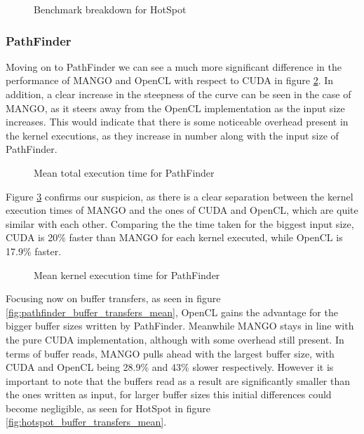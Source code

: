 \begin{figure}
    \centering
    \resizebox{!}{160pt}{
        
    }
    \captionsetup{justification=centering}
    \caption{Benchmark breakdown for HotSpot}
    \label{fig:hotspot_breakdown}
\end{figure}

\subsubsection{PathFinder}

Moving on to PathFinder we can see a much more significant difference in the performance of MANGO and OpenCL with respect to CUDA in figure \ref{fig:pathfinder_total_duration_mean}. In addition, a clear increase in the steepness of the curve can be seen in the case of MANGO, as it steers away from the OpenCL implementation as the input size increases. This would indicate that there is some noticeable overhead present in the kernel executions, as they increase in number along with the input size of PathFinder.

\begin{figure}
    \centering
    \resizebox{!}{160pt}{
        
    }
    \captionsetup{justification=centering}
    \caption{Mean total execution time for PathFinder}
    \label{fig:pathfinder_total_duration_mean}
\end{figure}

Figure \ref{fig:pathfinder_kernel_executions_mean} confirms our suspicion, as there is a clear separation between the kernel execution times of MANGO and the ones of CUDA and OpenCL, which are quite similar with each other. Comparing the the time taken for the biggest input size, CUDA is 20\% faster than MANGO for each kernel executed, while OpenCL is 17.9\% faster.

\begin{figure}
    \centering
    \resizebox{!}{160pt}{
        
    }
    \captionsetup{justification=centering}
    \caption{Mean kernel execution time for PathFinder}
    \label{fig:pathfinder_kernel_executions_mean}
\end{figure}

Focusing now on buffer transfers, as seen in figure \ref{fig:pathfinder_buffer_transfers_mean}, OpenCL gains the advantage for the bigger buffer sizes written by PathFinder. Meanwhile MANGO stays in line with the pure CUDA implementation, although with some overhead still present. In terms of buffer reads, MANGO pulls ahead with the largest buffer size, with CUDA and OpenCL being 28.9\% and 43\% slower respectively. However it is important to note that the buffers read as a result are significantly smaller than the ones written as input, for larger buffer sizes this initial differences could become negligible, as seen for HotSpot in figure \ref{fig:hotspot_buffer_transfers_mean}.

